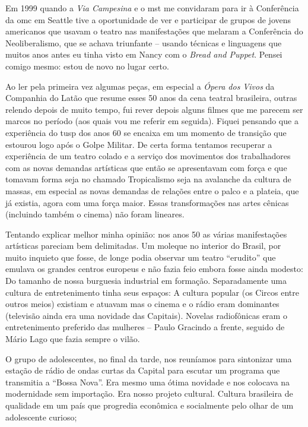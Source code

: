 Em 1999 quando a {\it Via Campesina} e o {\sc mst} me convidaram para ir
à Conferência da {\sc omc} em Seattle tive a oportunidade de ver e participar
de grupos de jovens americanos que usavam o teatro nas manifestações que
melaram a Conferência do Neoliberalismo, que se achava triunfante --
usando técnicas e linguagens que muitos anos antes eu tinha visto em
Nancy com o {\it Bread and Puppet}. Pensei comigo mesmo: estou de
novo no lugar certo.

\subject{***}

Ao ler pela primeira vez algumas peças, em especial a {\it Ópera dos
Vivos} da Companhia do Latão que resume esses 50 anos da cena teatral
brasileira, outras relendo depois de muito tempo, fui rever depois
alguns filmes que me parecem ser marcos no período (aos quais vou me
referir em seguida). Fiquei pensando que a experiência do {\sc tusp} dos anos
60 se encaixa em um momento de transição que estourou logo após o Golpe
Militar. De certa forma tentamos recuperar a experiência de um teatro
colado e a serviço dos movimentos dos trabalhadores com as novas
demandas artísticas que então se apresentavam com força e que tomavam
forma seja no chamado Tropicalismo seja na avalanche da cultura de
massas, em especial as novas demandas de relações entre o palco e a
plateia, que já existia, agora com uma força maior. Essas transformações
nas artes cênicas (incluindo também o cinema) não foram lineares.

Tentando explicar melhor minha opinião: nos anos 50 as várias
manifestações artísticas pareciam bem delimitadas. Um moleque no
interior do Brasil, por muito inquieto que fosse, de longe podia
observar um teatro “erudito” que emulava os grandes centros europeus e
não fazia feio embora fosse ainda modesto: Do tamanho de nossa burguesia
industrial em formação. Separadamente uma cultura de entretenimento
tinha seus espaços: A cultura popular (os Circos entre outros meios)
existiam e atuavam mas o cinema e o rádio eram dominantes (televisão
ainda era uma novidade das Capitais). Novelas radiofônicas eram o
entretenimento preferido das mulheres -- Paulo Gracindo a frente,
seguido de Mário Lago que fazia sempre o vilão.

O grupo de adolescentes, no final da tarde, nos reuníamos para
sintonizar uma estação de rádio de ondas curtas da Capital para escutar
um programa que transmitia a “Bossa Nova”. Era mesmo uma ótima novidade
e nos colocava na modernidade sem importação. Era nosso projeto
cultural. Cultura brasileira de qualidade em um país que progredia
econômica e socialmente pelo olhar de um adolescente curioso;

